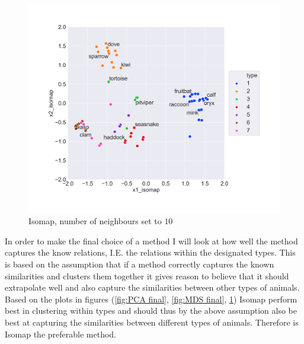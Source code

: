 \begin{figure}[H]
  \centering
  \includegraphics[width = 0.8\linewidth]{../Visualization_Isomap_n_10.png}
  \caption{Isomap, number of neighbours set to $10$}
  \label{fig:isomap 10 final}
\end{figure}

In order to make the final choice of a method I will look at how well the method captures the know relations, I.E. the relations within the designated types. This is based on the assumption that if a method correctly captures the known similarities and clusters them together it gives reason to believe that it should extrapolate well and also capture the similarities between other types of animals. Based on the plots in figures (\ref{fig:PCA final}, \ref{fig:MDS final}, \ref{fig:isomap 10 final}) Isomap perform best in clustering within types and should thus by the above assumption also be best at capturing the similarities between different types of animals. Therefore is Isomap the preferable method.
